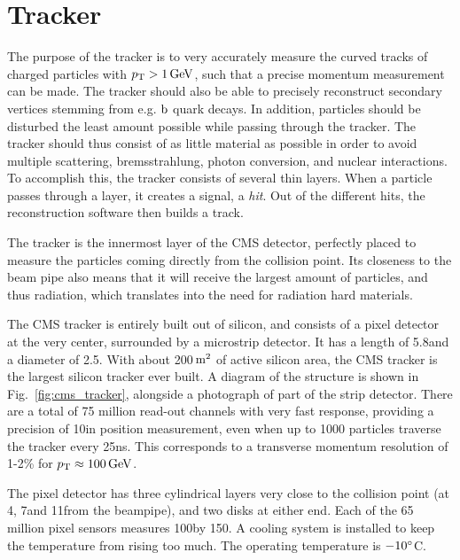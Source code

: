 \section{Tracker \label{sec:cms_tracker}}

The purpose of the tracker is to very accurately measure the curved tracks of charged
particles with $\pt > 1\GeV$, such that a precise momentum measurement can be made. 
The tracker should also be able to precisely reconstruct secondary
vertices stemming from e.g. $\cPqb$ quark decays. 
In addition, particles should be disturbed the least amount possible while passing through the
tracker. The tracker should thus consist of as little material as possible in order to avoid
multiple scattering, bremsstrahlung, photon conversion, and nuclear interactions.
To accomplish this, the tracker consists of several thin layers. When a particle passes
through a layer, it creates a signal, a \textit{hit}. Out of the different hits, the reconstruction
software then builds a track. 

The tracker is the innermost layer of the CMS detector, perfectly placed to measure the particles
coming directly from the collision point. Its closeness to the beam pipe also means that it will
receive the largest amount of particles, and thus radiation, which translates into the need for
radiation hard materials. 

The CMS tracker is entirely built out of silicon, and consists of a pixel detector at the very
center, surrounded by a microstrip detector. It has a length of 5.8\meter and a diameter of
2.5\meter. With about 200$\meter^\text{2}$ of active silicon area, the CMS tracker is the largest
silicon tracker ever built. A diagram of the structure is shown in
Fig.~\ref{fig:cms_tracker}, alongside a photograph of part of the strip detector. 
There are a total of 75 million read-out channels with very fast response, providing a precision of
10\mum in position measurement, even when up to 1000 particles traverse the tracker every
25\unit{ns}. This corresponds to a transverse momentum resolution of 1-2\% for $\pt \approx
100\GeV$. 

The pixel detector has three cylindrical layers very close to the collision point (at 4\cm, 7\cm and
11\cm from the beampipe), and two disks at either end. Each of the 65 million pixel sensors measures
100\mum by 150\mum. A cooling system is installed to keep the temperature from rising too much. The
operating temperature is $-10\de$C.

